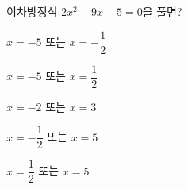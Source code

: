 이차방정식 $2x^2-9x-5=0$을 풀면?
\begin{choicesii}{\rule[-3ex]{0pt}{8ex}$x=-5$ 또는 $x=-\dfrac{1}{2}$}{\rule[-3ex]{0pt}{8ex}$x=-5$ 또는 $x=\dfrac{1}{2}$}{\rule[-3ex]{0pt}{8ex}$x=-2$ 또는 $x=3$}{\rule[-3ex]{0pt}{8ex}$x=-\dfrac{1}{2}$ 또는 $x=5$}{\rule[-3ex]{0pt}{8ex}$x=\dfrac{1}{2}$ 또는 $x=5$}\end{choicesii}
